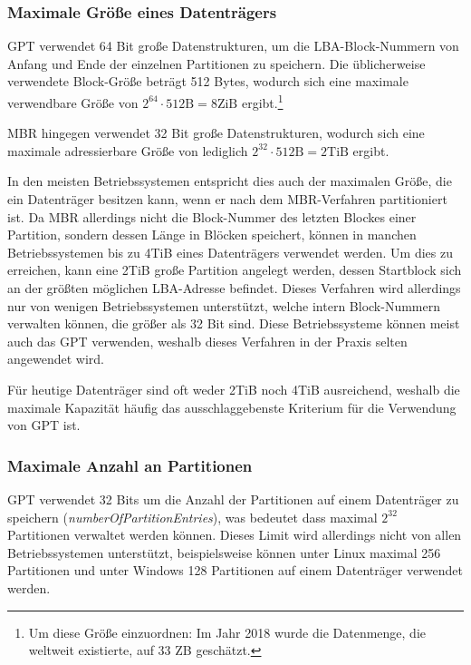 \subsubsection{Maximale Größe eines Datenträgers}
\label{sec:gpt:limits:max-partition-size}

GPT verwendet 64 Bit große Datenstrukturen, um die LBA-Block-Nummern von Anfang und Ende der einzelnen Partitionen zu speichern.
Die üblicherweise verwendete Block-Größe beträgt 512 Bytes, wodurch sich eine maximale verwendbare Größe von $ 2^{64} \cdot 512 \mathrm{B} = 8 \mathrm{ZiB} $ ergibt.\footnote{
    Um diese Größe einzuordnen: Im Jahr 2018 wurde die Datenmenge, die weltweit existierte, auf 33 ZB geschätzt.\cite{global-datasphere-estimate}
}

MBR hingegen verwendet 32 Bit große Datenstrukturen, wodurch sich eine maximale adressierbare Größe von lediglich $ 2^{32} \cdot 512 \mathrm{B} = 2 \mathrm{TiB} $ ergibt.

In den meisten Betriebssystemen entspricht dies auch der maximalen Größe, die ein Datenträger besitzen kann, wenn er nach dem MBR-Verfahren partitioniert ist.
Da MBR allerdings nicht die Block-Nummer des letzten Blockes einer Partition, sondern dessen Länge in Blöcken speichert, können in manchen Betriebssystemen bis zu 4TiB eines Datenträgers verwendet werden. 
Um dies zu erreichen, kann eine 2TiB große Partition angelegt werden, dessen Startblock sich an der größten möglichen LBA-Adresse befindet.
Dieses Verfahren wird allerdings nur von wenigen Betriebssystemen unterstützt, welche intern Block-Nummern verwalten können, die größer als 32 Bit sind.
Diese Betriebssysteme können meist auch das GPT verwenden, weshalb dieses Verfahren in der Praxis selten angewendet wird.\cite{mbr-4tb-workaround}

Für heutige Datenträger sind oft weder 2TiB noch 4TiB ausreichend, weshalb die maximale Kapazität häufig das ausschlaggebenste Kriterium für die Verwendung von GPT ist.

\subsubsection{Maximale Anzahl an Partitionen}
\label{sec:gpt:limits:max-partition-count}

GPT verwendet 32 Bits um die Anzahl der Partitionen auf einem Datenträger zu speichern (\textit{numberOfPartitionEntries}), was bedeutet dass maximal $ 2^{32} $ Partitionen verwaltet werden können.
Dieses Limit wird allerdings nicht von allen Betriebssystemen unterstützt, beispielsweise können unter Linux maximal 256 Partitionen und unter Windows 128 Partitionen auf einem Datenträger verwendet werden.

